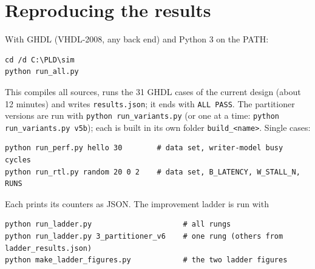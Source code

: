 \documentclass[11pt,a4paper]{article}
\newcommand{\code}[1]{\texttt{#1}}
\begin{document}
\section{Reproducing the results}
With GHDL (VHDL-2008, any back end) and Python 3 on the PATH:
\begin{lstlisting}
cd /d C:\PLD\sim
python run_all.py
\end{lstlisting}
This compiles all sources, runs the 31 GHDL cases of the current design (about 12 minutes) and writes \code{results.json}; it ends with \code{ALL PASS}. The partitioner versions are run with \code{python run\_variants.py} (or one at a time: \code{python run\_variants.py v5b}); each is built in its own folder \code{build\_<name>}. Single cases:
\begin{lstlisting}
python run_perf.py hello 30        # data set, writer-model busy cycles
python run_rtl.py random 20 0 2    # data set, B_LATENCY, W_STALL_N, RUNS
\end{lstlisting}
Each prints its counters as JSON. The improvement ladder is run with
\begin{lstlisting}
python run_ladder.py                     # all rungs
python run_ladder.py 3_partitioner_v6    # one rung (others from ladder_results.json)
python make_ladder_figures.py            # the two ladder figures
\end{lstlisting}
\end{document}
